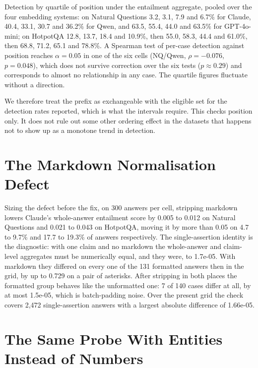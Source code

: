 \documentclass[11pt]{article}
\begin{document}
Detection by quartile of position under the entailment aggregate, pooled over the four embedding systems: on Natural Questions 3.2, 3.1, 7.9 and 6.7\% for Claude, 40.4, 33.1, 30.7 and 36.2\% for Qwen, and 63.5, 55.4, 44.0 and 63.5\% for GPT-4o-mini; on HotpotQA 12.8, 13.7, 18.4 and 10.9\%, then 55.0, 58.3, 44.4 and 61.0\%, then 68.8, 71.2, 65.1 and 78.8\%. A Spearman test of per-case detection against position reaches $\alpha = 0.05$ in one of the six cells (NQ/Qwen, $\rho = -0.076$, $p = 0.048$), which does not survive correction over the six tests ($p \approx 0.29$) and corresponds to almost no relationship in any case. The quartile figures fluctuate without a direction.

We therefore treat the prefix as exchangeable with the eligible set for the detection rates reported, which is what the intervals require. This checks position only. It does not rule out some other ordering effect in the datasets that happens not to show up as a monotone trend in detection.


\section{The Markdown Normalisation Defect}
\label{app:markdown}

Sizing the defect before the fix, on 300 answers per cell, stripping markdown lowers Claude's whole-answer entailment score by 0.005 to 0.012 on Natural Questions and 0.021 to 0.043 on HotpotQA, moving it by more than 0.05 on 4.7 to 9.7\% and 17.7 to 19.3\% of answers respectively. The single-assertion identity is the diagnostic: with one claim and no markdown the whole-answer and claim-level aggregates must be numerically equal, and they were, to 1.7e-05. With markdown they differed on every one of the 131 formatted answers then in the grid, by up to 0.729 on a pair of asterisks. After stripping in both places the formatted group behaves like the unformatted one: 7 of 140 cases differ at all, by at most 1.5e-05, which is batch-padding noise. Over the present grid the check covers 2,472 single-assertion answers with a largest absolute difference of 1.66e-05.



\section{The Same Probe With Entities Instead of Numbers}
\label{sec:entity}
\end{document}
